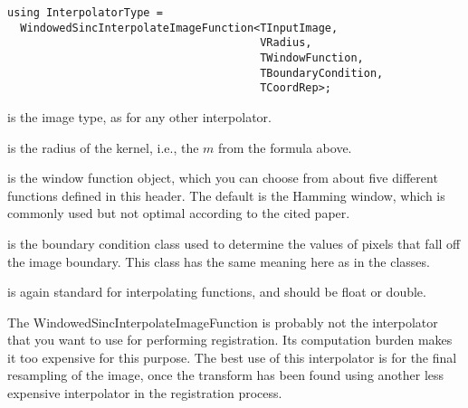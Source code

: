 \small
\begin{verbatim}
using InterpolatorType =
  WindowedSincInterpolateImageFunction<TInputImage,
                                       VRadius,
                                       TWindowFunction,
                                       TBoundaryCondition,
                                       TCoordRep>;
\end{verbatim}
\normalsize

 is the image type, as for any other interpolator.

 is the radius of the kernel, i.e., the $m$ from the
formula above.

 is the window function object, which you can choose from
about five different functions defined in this header. The default is the
Hamming window, which is commonly used but not optimal according to the cited
paper.

 is the boundary condition class used to determine the
values of pixels that fall off the image boundary. This class has the same
meaning here as in the  classes.

 is again standard for interpolating functions, and should be
float or double.


The WindowedSincInterpolateImageFunction is probably not the interpolator that
you want to use for performing registration. Its computation burden makes it
too expensive for this purpose. The best use of this interpolator is for the
final resampling of the image, once the transform has been found using
another less expensive interpolator in the registration process.
